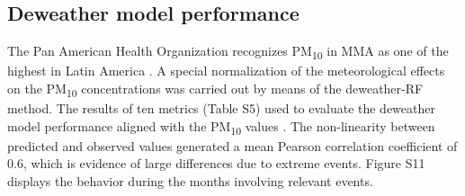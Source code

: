 \documentclass[sn-mathphys-num]{sn-jnl}
\begin{document}
\subsection{Deweather model performance}
The Pan American Health Organization recognizes PM\textsubscript{10} in MMA as one of the highest in Latin America \citep{Riojas-Rodriguez2016}. A special normalization of the meteorological effects on the PM\textsubscript{10} concentrations was carried out by means of the deweather-RF method. The results of ten metrics (Table S5) used to evaluate the deweather model performance aligned with the PM\textsubscript{10} values \citep{Lv_2022}. The non-linearity between predicted and observed values generated a mean Pearson correlation coefficient of 0.6, which is evidence of large differences due to extreme events. Figure S11 displays the behavior during the months involving relevant events. 
\end{document}
